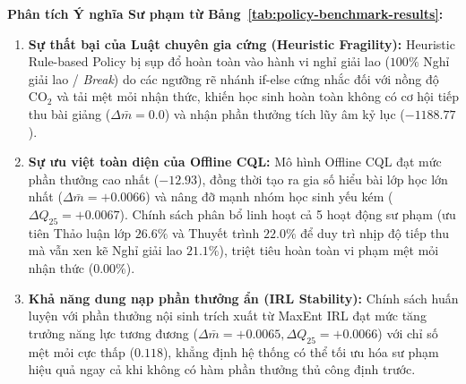 \noindent\textbf{Phân tích Ý nghĩa Sư phạm từ Bảng~\ref{tab:policy-benchmark-results}:}
\begin{enumerate}[label=\textbf{\arabic*.}]
  \item \textbf{Sự thất bại của Luật chuyên gia cứng (Heuristic Fragility):} Heuristic Rule-based Policy bị sụp đổ hoàn toàn vào hành vi nghỉ giải lao ($100\%$ Nghỉ giải lao / \textit{Break}) do các ngưỡng rẽ nhánh if-else cứng nhắc đối với nồng độ $\text{CO}_2$ và tải mệt mỏi nhận thức, khiến học sinh hoàn toàn không có cơ hội tiếp thu bài giảng ($\Delta\bar{m} = 0.0$) và nhận phần thưởng tích lũy âm kỷ lục ($-1188.77$).
  \item \textbf{Sự ưu việt toàn diện của Offline CQL:} Mô hình Offline CQL đạt mức phần thưởng cao nhất ($-12.93$), đồng thời tạo ra gia số hiểu bài lớp học lớn nhất ($\Delta\bar{m} = +0.0066$) và nâng đỡ mạnh nhóm học sinh yếu kém ($\Delta Q_{25} = +0.0067$). Chính sách phân bổ linh hoạt cả 5 hoạt động sư phạm (ưu tiên Thảo luận lớp $26.6\%$ và Thuyết trình $22.0\%$ để duy trì nhịp độ tiếp thu mà vẫn xen kẽ Nghỉ giải lao $21.1\%$), triệt tiêu hoàn toàn vi phạm mệt mỏi nhận thức ($0.00\%$).
  \item \textbf{Khả năng dung nạp phần thưởng ẩn (IRL Stability):} Chính sách huấn luyện với phần thưởng nội sinh trích xuất từ MaxEnt IRL đạt mức tăng trưởng năng lực tương đương ($\Delta\bar{m} = +0.0065, \Delta Q_{25} = +0.0066$) với chỉ số mệt mỏi cực thấp ($0.118$), khẳng định hệ thống có thể tối ưu hóa sư phạm hiệu quả ngay cả khi không có hàm phần thưởng thủ công định trước.
\end{enumerate}

\newpage

